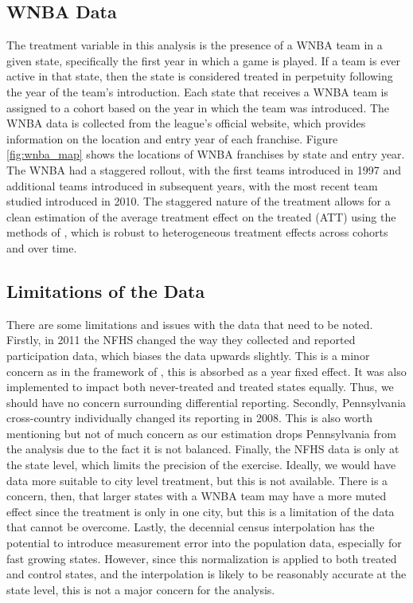 \documentclass[11pt]{article}
\newcommand{\1}[1]{\mathbb{I}\{#1\}}
\theoremstyle{plain}
\begin{document}
\subsection*{WNBA Data}
The treatment variable in this analysis is the presence of a WNBA team in a given state, specifically the first year in which a game is played. If a team is ever active in that state, then the state is considered treated in perpetuity following the year of the team's introduction. Each state that receives a WNBA team is assigned to a cohort based on the year in which the team was introduced. The WNBA data is collected from the league's official website, which provides information on the location and entry year of each franchise. Figure \ref{fig:wnba_map} shows the locations of WNBA franchises by state and entry year. The WNBA had a staggered rollout, with the first teams introduced in 1997 and additional teams introduced in subsequent years, with the most recent team studied introduced in 2010. The staggered nature of the treatment allows for a clean estimation of the average treatment effect on the treated (ATT) using the methods of \cite{csa_2021}, which is robust to heterogeneous treatment effects across cohorts and over time.

\subsection*{Limitations of the Data}

There are some limitations and issues with the data that need to be noted. Firstly, in 2011 the NFHS changed the way they collected and reported participation data, which biases the data upwards slightly. This is a minor concern as in the framework of \cite{csa_2021}, this is absorbed as a year fixed effect. It was also implemented to impact both never-treated and treated states equally. Thus, we should have no concern surrounding differential reporting. Secondly, Pennsylvania cross-country individually changed its reporting in 2008. This is also worth mentioning but not of much concern as our estimation drops Pennsylvania from the analysis due to the fact it is not balanced. Finally, the NFHS data is only at the state level, which limits the precision of the exercise. Ideally, we would have data more suitable to city level treatment, but this is not available. There is a concern, then, that larger states with a WNBA team may have a more muted effect since the treatment is only in one city, but this is a limitation of the data that cannot be overcome. Lastly, the decennial census interpolation has the potential to introduce measurement error into the population data, especially for fast growing states. However, since this normalization is applied to both treated and control states, and the interpolation is likely to be reasonably accurate at the state level, this is not a major concern for the analysis.
\end{document}
